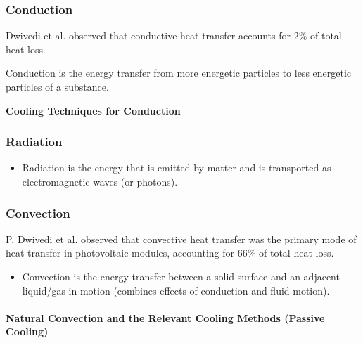 \subsubsection{Conduction} %
\noindent Dwivedi et al. observed that conductive heat transfer accounts for 2\% of total heat loss.\par
\noindent Conduction is the energy transfer from more energetic particles to less energetic particles of a substance.\par
\noindent \textbf{Cooling Techniques for Conduction}\par

\subsubsection{Radiation} %
\begin{itemize}
    \item Radiation is the energy that is emitted by matter and is transported as electromagnetic waves (or photons).
\end{itemize}

\subsubsection{Convection} %
\noindent P. Dwivedi et al. observed that convective heat transfer was the primary mode of heat transfer in photovoltaic modules, accounting for 66\% of total heat loss.
\begin{itemize}
    \item Convection is the energy transfer between a solid surface and an adjacent liquid/gas in motion (combines effects of conduction and fluid motion).
\end{itemize}

\paragraph{Natural Convection and the Relevant Cooling Methods (Passive Cooling)} %
